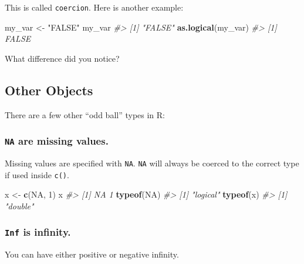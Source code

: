 \documentclass[
]{book}
\newenvironment{Shaded}{\begin{snugshade}}{\end{snugshade}}
\newcommand{\CommentTok}[1]{\textcolor[rgb]{0.56,0.35,0.01}{\textit{#1}}}
\newcommand{\DecValTok}[1]{\textcolor[rgb]{0.00,0.00,0.81}{#1}}
\newcommand{\KeywordTok}[1]{\textcolor[rgb]{0.13,0.29,0.53}{\textbf{#1}}}
\newcommand{\NormalTok}[1]{#1}
\newcommand{\OtherTok}[1]{\textcolor[rgb]{0.56,0.35,0.01}{#1}}
\newcommand{\StringTok}[1]{\textcolor[rgb]{0.31,0.60,0.02}{#1}}
\begin{document}
This is called \texttt{coercion}. Here is another example:

\begin{Shaded}
\begin{Highlighting}[]
\NormalTok{my_var <-}\StringTok{ "FALSE"}
\NormalTok{my_var}
\CommentTok{#> [1] "FALSE"}
\KeywordTok{as.logical}\NormalTok{(my_var)}
\CommentTok{#> [1] FALSE}
\end{Highlighting}
\end{Shaded}

What difference did you notice?

\hypertarget{other-objects}{%
\subsection{Other Objects}\label{other-objects}}

There are a few other ``odd ball'' types in R:

\hypertarget{na-are-missing-values.}{%
\subsubsection*{\texorpdfstring{\texttt{NA} are missing values.}{NA are missing values.}}\label{na-are-missing-values.}}

Missing values are specified with \texttt{NA}. \texttt{NA} will always be coerced to the correct type if used inside \texttt{c()}.

\begin{Shaded}
\begin{Highlighting}[]
\NormalTok{x <-}\StringTok{ }\KeywordTok{c}\NormalTok{(}\OtherTok{NA}\NormalTok{, }\DecValTok{1}\NormalTok{)}
\NormalTok{x}
\CommentTok{#> [1] NA  1}
\KeywordTok{typeof}\NormalTok{(}\OtherTok{NA}\NormalTok{)}
\CommentTok{#> [1] "logical"}
\KeywordTok{typeof}\NormalTok{(x)}
\CommentTok{#> [1] "double"}
\end{Highlighting}
\end{Shaded}

\hypertarget{inf-is-infinity.}{%
\subsubsection*{\texorpdfstring{\texttt{Inf} is infinity.}{Inf is infinity.}}\label{inf-is-infinity.}}

You can have either positive or negative infinity.
\end{document}
